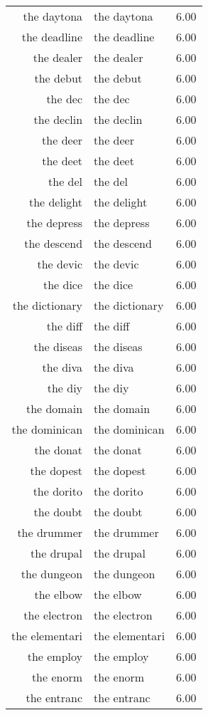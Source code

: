 \begin{table}[ht]
\begin{tabular}{rlr}
  the daytona & the daytona & 6.00 \\ 
  the deadline & the deadline & 6.00 \\ 
  the dealer & the dealer & 6.00 \\ 
  the debut & the debut & 6.00 \\ 
  the dec & the dec & 6.00 \\ 
  the declin & the declin & 6.00 \\ 
  the deer & the deer & 6.00 \\ 
  the deet & the deet & 6.00 \\ 
  the del & the del & 6.00 \\ 
  the delight & the delight & 6.00 \\ 
  the depress & the depress & 6.00 \\ 
  the descend & the descend & 6.00 \\ 
  the devic & the devic & 6.00 \\ 
  the dice & the dice & 6.00 \\ 
  the dictionary & the dictionary & 6.00 \\ 
  the diff & the diff & 6.00 \\ 
  the diseas & the diseas & 6.00 \\ 
  the diva & the diva & 6.00 \\ 
  the diy & the diy & 6.00 \\ 
  the domain & the domain & 6.00 \\ 
  the dominican & the dominican & 6.00 \\ 
  the donat & the donat & 6.00 \\ 
  the dopest & the dopest & 6.00 \\ 
  the dorito & the dorito & 6.00 \\ 
  the doubt & the doubt & 6.00 \\ 
  the drummer & the drummer & 6.00 \\ 
  the drupal & the drupal & 6.00 \\ 
  the dungeon & the dungeon & 6.00 \\ 
  the elbow & the elbow & 6.00 \\ 
  the electron & the electron & 6.00 \\ 
  the elementari & the elementari & 6.00 \\ 
  the employ & the employ & 6.00 \\ 
  the enorm & the enorm & 6.00 \\ 
  the entranc & the entranc & 6.00 \\ 

\end{tabular}
\end{table}
